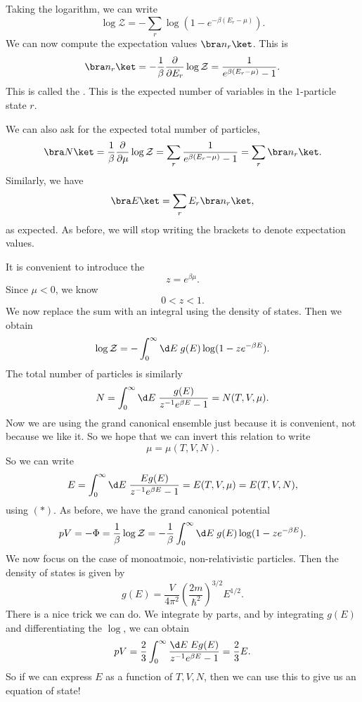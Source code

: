 \documentclass[a4paper]{article}
\begin{document}
Taking the logarithm, we can write
\[
  \log \mathcal{Z} = - \sum_r \log(1 - e^{-\beta (E_r - \mu)}).
\]
We can now compute the expectation values $\bra n_r\ket$. This is
\[
  \bra n_r \ket = - \frac{1}{\beta} \frac{\partial}{\partial E_r} \log \mathcal{Z} = \frac{1}{e^{\beta(E_r - \mu)} - 1}.
\]
This is called the . This is the expected number of variables in the $1$-particle state $r$.

We can also ask for the expected total number of particles,
\[
  \bra N\ket = \frac{1}{\beta} \frac{\partial}{\partial \mu}\log \mathcal{Z} = \sum_r \frac{1}{e^{\beta(E_r - \mu)} - 1} = \sum_r \bra n_r\ket.
\]
Similarly, we have
\[
  \bra E\ket = \sum_r E_r \bra n_r\ket,
\]
as expected. As before, we will stop writing the brackets to denote expectation values.

It is convenient to introduce the 
\[
  z = e^{\beta\mu}.
\]
Since $\mu < 0$, we know
\[
  0 < z < 1.
\]
We now replace the sum with an integral using the density of states. Then we obtain
\[
  \log \mathcal{Z} = - \int_0^\infty \d E\; g(E) \log (1 - z e^{-\beta E}).
\]
The total number of particles is similarly
\[
  N = \int_0^\infty \d E\; \frac{g(E)}{z^{-1} e^{\beta E} - 1} = N(T, V, \mu).
\]
Now we are using the grand canonical ensemble just because it is convenient, not because we like it. So we hope that we can invert this relation to write %
\[
  \mu = \mu(T, V, N).\tag{$*$}
\]
So we can write
\[
  E = \int_0^\infty \d E\; \frac{E g(E)}{z^{-1} e^{\beta E} - 1} = E(T, V, \mu) = E(T, V, N),
\]
using $(*)$. As before, we have the grand canonical potential
\[
  pV = -\Phi = \frac{1}{\beta} \log \mathcal{Z} = -\frac{1}{\beta} \int_0^\infty \d E\; g(E) \log(1 - ze^{-\beta E}).
\]
We now focus on the case of monoatmoic, non-relativistic particles. Then the density of states is given by
\[
  g(E) = \frac{V}{4\pi^2} \left(\frac{2m}{\hbar^2}\right)^{3/2} E^{1/2}.
\]
There is a nice trick we can do. We integrate by parts, and by integrating $g(E)$ and differentiating the $\log$, we can obtain
\[
  pV = \frac{2}{3} \int_0^\infty \frac{\d E\; Eg(E)}{z^{-1} e^{\beta E} - 1} = \frac{2}{3} E.
\]
So if we can express $E$ as a function of $T, V, N$, then we can use this to give us an equation of state!
\end{document}
